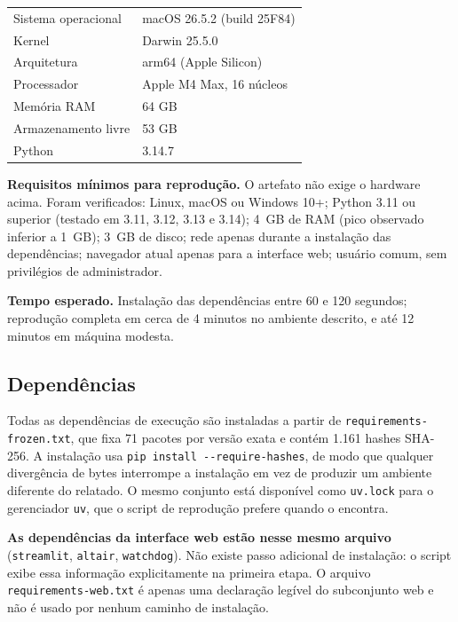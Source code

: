 \documentclass[12pt]{article}
\begin{document}
\begin{table}[h]
\centering
\begin{tabular}{ll}
\hline
Sistema operacional & macOS 26.5.2 (build 25F84) \\
Kernel & Darwin 25.5.0 \\
Arquitetura & arm64 (Apple Silicon) \\
Processador & Apple M4 Max, 16 núcleos \\
Memória RAM & 64 GB \\
Armazenamento livre & 53 GB \\
Python & 3.14.7 \\
\hline
\end{tabular}
\end{table}

\textbf{Requisitos mínimos para reprodução.} O artefato não exige o hardware
acima. Foram verificados: Linux, macOS ou Windows 10+; Python 3.11 ou superior
(testado em 3.11, 3.12, 3.13 e 3.14); 4~GB de RAM (pico observado inferior a
1~GB); 3~GB de disco; rede apenas durante a instalação das dependências;
navegador atual apenas para a interface web; usuário comum, sem privilégios de
administrador.

\textbf{Tempo esperado.} Instalação das dependências entre 60 e 120 segundos;
reprodução completa em cerca de 4 minutos no ambiente descrito, e até 12 minutos
em máquina modesta.

\subsection{Dependências}

Todas as dependências de execução são instaladas a partir de
\texttt{requirements-frozen.txt}, que fixa 71 pacotes por versão exata e contém
1.161 hashes SHA-256. A instalação usa \texttt{pip install -{}-require-hashes},
de modo que qualquer divergência de bytes interrompe a instalação em vez de
produzir um ambiente diferente do relatado. O mesmo conjunto está disponível como
\texttt{uv.lock} para o gerenciador \texttt{uv}, que o script de reprodução
prefere quando o encontra.

\textbf{As dependências da interface web estão nesse mesmo arquivo}
(\texttt{streamlit}, \texttt{altair}, \texttt{watchdog}). Não existe passo
adicional de instalação: o script exibe essa informação explicitamente na
primeira etapa. O arquivo \texttt{requirements-web.txt} é apenas uma declaração
legível do subconjunto web e não é usado por nenhum caminho de instalação.
\end{document}
